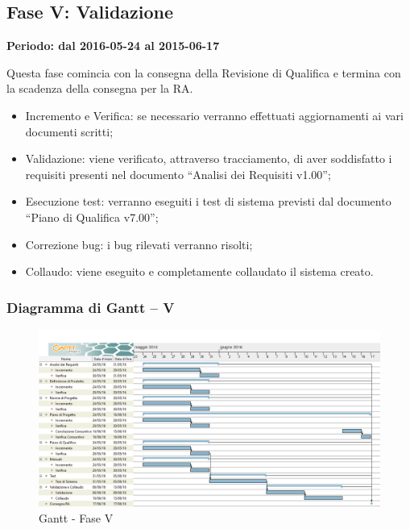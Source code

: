 \documentclass[../PianoProgetto.tex]{subfiles}
\begin{document}
	
	\subsection{Fase V: Validazione}
		\textbf{Periodo: dal 2016-05-24 al 2015-06-17}
		
		Questa fase comincia con la consegna della Revisione di Qualifica e termina con la scadenza della consegna per la RA.

		\begin{itemize}
				\item Incremento e Verifica: se necessario verranno effettuati aggiornamenti ai vari documenti scritti;

				\item Validazione: viene verificato, attraverso tracciamento, di aver soddisfatto i requisiti presenti nel documento “Analisi dei Requisiti v1.00”;

				\item Esecuzione test: verranno eseguiti i test di sistema previsti dal documento “Piano di Qualifica v7.00”;

				\item Correzione bug: i bug rilevati verranno risolti;

				\item Collaudo: viene eseguito e completamente collaudato il sistema creato.
		\end{itemize}
		
		\subsubsection{Diagramma di Gantt – V}
			\begin{figure}[!h]
				\centering
				\includegraphics[width=\textwidth]{gantt_png/7-verifica}
				\caption{Gantt - Fase V}
				\label{fig:Gantt - Fase V}
			\end{figure}
			
\end{document}
